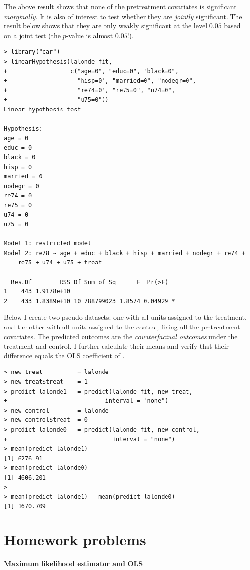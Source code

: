 The above result shows that none of the pretreatment covariates is significant {\it  marginally}. It is also of interest to test whether they are {\it jointly} significant. The result below shows that they are only weakly significant at the level $0.05$ based on a joint test (the $p$-value is almost $0.05$!). 

\begin{lstlisting}
> library("car")
> linearHypothesis(lalonde_fit,
+                  c("age=0", "educ=0", "black=0",
+                    "hisp=0", "married=0", "nodegr=0",
+                    "re74=0", "re75=0", "u74=0",
+                    "u75=0"))
Linear hypothesis test

Hypothesis:
age = 0
educ = 0
black = 0
hisp = 0
married = 0
nodegr = 0
re74 = 0
re75 = 0
u74 = 0
u75 = 0

Model 1: restricted model
Model 2: re78 ~ age + educ + black + hisp + married + nodegr + re74 + 
    re75 + u74 + u75 + treat

  Res.Df        RSS Df Sum of Sq      F  Pr(>F)  
1    443 1.9178e+10                              
2    433 1.8389e+10 10 788799023 1.8574 0.04929 *
\end{lstlisting}


Below I create two pseudo datasets: one with all units assigned to the treatment, and the other with all units assigned to the control, fixing all the pretreatment covariates. The predicted outcomes are the {\it counterfactual outcomes} under the treatment and control. I further calculate their means and verify that their difference equals the OLS coefficient of . 


\begin{lstlisting}
> new_treat          = lalonde
> new_treat$treat    = 1
> predict_lalonde1   = predict(lalonde_fit, new_treat, 
+                            interval = "none")
> new_control        = lalonde
> new_control$treat  = 0
> predict_lalonde0   = predict(lalonde_fit, new_control, 
+                              interval = "none")
> mean(predict_lalonde1)
[1] 6276.91
> mean(predict_lalonde0)
[1] 4606.201
> 
> mean(predict_lalonde1) - mean(predict_lalonde0)
[1] 1670.709
\end{lstlisting}



\section{Homework problems}

\paragraph{Maximum likelihood estimator and OLS}
\label{hw5:normal-mle}


